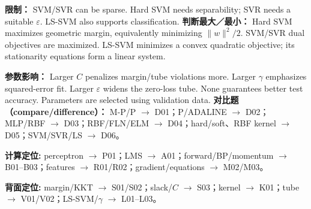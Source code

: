 \textbf{限制：} SVM/SVR can be sparse. Hard SVM needs separability; SVR needs a suitable $\varepsilon$. LS-SVM also supports classification.
\textbf{判断最大／最小：} Hard SVM maximizes geometric margin, equivalently minimizing $\|w\|^2/2$. SVM/SVR dual objectives are maximized. LS-SVM minimizes a convex quadratic objective; its stationarity equations form a linear system.

\textbf{参数影响：} Larger $C$ penalizes margin/tube violations more. Larger $\gamma$ emphasizes squared-error fit. Larger $\varepsilon$ widens the zero-loss tube. None guarantees better test accuracy. Parameters are selected using validation data.
\textbf{对比题（compare/difference）：} M-P/P $\to$ D01；P/ADALINE $\to$ D02；MLP/RBF $\to$ D03；RBF/FLN/ELM $\to$ D04；hard/soft、RBF kernel $\to$ D05；SVM/SVR/LS $\to$ D06。

\textbf{计算定位:} perceptron $\to$ P01；LMS $\to$ A01；forward/BP/momentum $\to$ B01--B03；features $\to$ R01/R02；gradient/equations $\to$ M02/M03。

\textbf{背面定位:} margin/KKT $\to$ S01/S02；slack/$C$ $\to$ S03；kernel $\to$ K01；tube $\to$ V01/V02；LS-SVM/$\gamma$ $\to$ L01--L03。
\columnend
